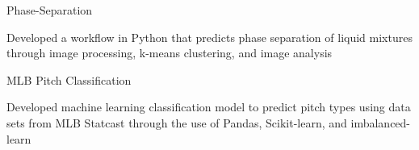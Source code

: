 
\begin{cventries}
  \cventry
    {} %
    {Phase-Separation} %
    {} %
    {} %
    {
      \begin{cvitems} %
        \item {Developed a workflow in Python that predicts phase separation of liquid
            mixtures through image processing, k-means clustering, and image
              analysis}
      \end{cvitems}
    }

  \cventry
    {} %
    {MLB Pitch Classification} %
    {} %
    {} %
    {
      \begin{cvitems} %
      	\item {Developed machine learning classification model to predict pitch types using
            data sets from MLB Statcast through the use of Pandas, Scikit-learn, and
              imbalanced-learn}
      \end{cvitems}
    }

\end{cventries}
